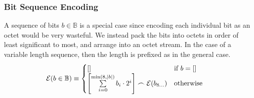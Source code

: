 \subsubsection{Bit Sequence Encoding}
A sequence of bits $b \in \mathbb{B}$ is a special case since encoding each individual bit as an octet would be very wasteful. We instead pack the bits into octets in order of least significant to most, and arrange into an octet stream. In the case of a variable length sequence, then the length is prefixed as in the general case.
\begin{align}
  \se(b \in \mathbb{B}) &\equiv \begin{cases}
    [] &\when b = [] \\
    \left[\sum\limits_{i=0}^{\min(8, |b|)}{b_i\cdot 2^i}\right] \concat \se(b_{8\dots}) &\otherwise\\
  \end{cases}
\end{align}

%
%
%

